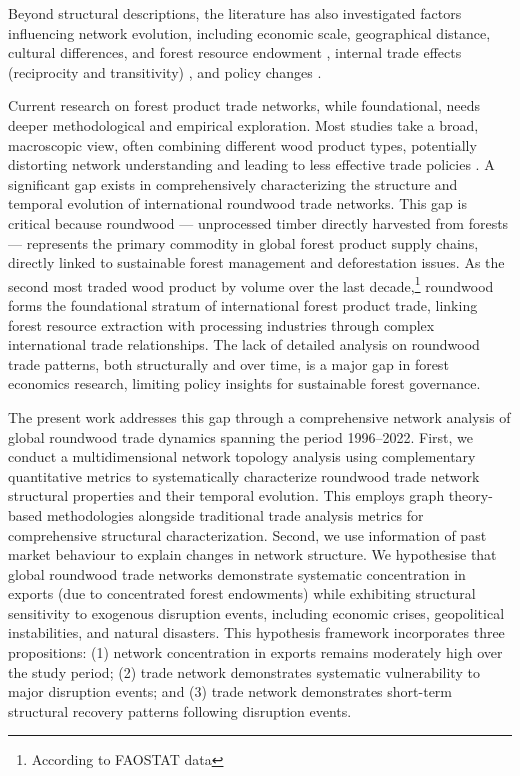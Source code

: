 \documentclass[
  authoryear,
  review,
  3p]{elsarticle}
\begin{document}
Beyond structural descriptions, the literature has also investigated
factors influencing network evolution, including economic scale,
geographical distance, cultural differences, and forest resource
endowment \citep{gao_trade_2024}, internal trade effects (reciprocity
and transitivity) \citep{shen_structural_2022}, and policy changes
\citep{huang_static_2024}.

Current research on forest product trade networks, while foundational,
needs deeper methodological and empirical exploration. Most studies take
a broad, macroscopic view, often combining different wood product types,
potentially distorting network understanding and leading to less
effective trade policies \citep{gao_trade_2024, liu_analysis_2024}. A
significant gap exists in comprehensively characterizing the structure
and temporal evolution of international roundwood trade networks. This
gap is critical because roundwood --- unprocessed timber directly
harvested from forests --- represents the primary commodity in global
forest product supply chains, directly linked to sustainable forest
management and deforestation issues. As the second most traded wood
product by volume over the last decade,\footnote{According to FAOSTAT
  data} roundwood forms the foundational stratum of international forest
product trade, linking forest resource extraction with processing
industries through complex international trade relationships. The lack
of detailed analysis on roundwood trade patterns, both structurally and
over time, is a major gap in forest economics research, limiting policy
insights for sustainable forest governance.

The present work addresses this gap through a comprehensive network
analysis of global roundwood trade dynamics spanning the period
1996--2022. First, we conduct a multidimensional network topology
analysis using complementary quantitative metrics to systematically
characterize roundwood trade network structural properties and their
temporal evolution. This employs graph theory-based methodologies
alongside traditional trade analysis metrics for comprehensive
structural characterization. Second, we use information of past market
behaviour to explain changes in network structure. We hypothesise that
global roundwood trade networks demonstrate systematic concentration in
exports (due to concentrated forest endowments) while exhibiting
structural sensitivity to exogenous disruption events, including
economic crises, geopolitical instabilities, and natural disasters. This
hypothesis framework incorporates three propositions: (1) network
concentration in exports remains moderately high over the study period;
(2) trade network demonstrates systematic vulnerability to major
disruption events; and (3) trade network demonstrates short-term
structural recovery patterns following disruption events.
\end{document}
